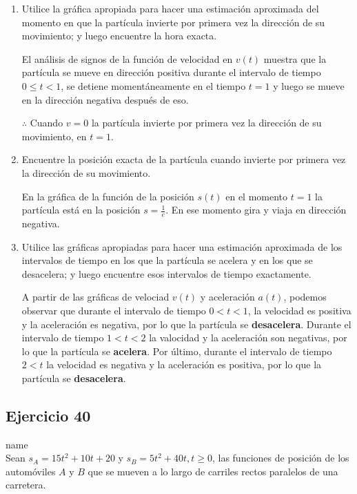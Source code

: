 \documentclass[12pt]{article}
\begin{document}
\begin{enumerate}[label=(\alph*)]
\item Utilice la gráfica apropiada para hacer una estimación aproximada del momento en que la partícula invierte por primera vez la dirección de su movimiento; y luego encuentre la hora exacta.

  El análisis de signos de la función de velocidad en $v(t)$ muestra que la partícula se mueve en dirección positiva durante el intervalo de tiempo $0 \leq t < 1$, se detiene momentáneamente en el tiempo $t = 1$ y luego se mueve en la dirección negativa después de eso.
  
  $\therefore $ Cuando $v=0$ la partícula invierte por primera vez la dirección de su movimiento, en $t=1$.
  
\item Encuentre la posición exacta de la partícula cuando invierte por primera vez la dirección de su movimiento.

  En la gráfica de la función de la posición $s(t)$ en el momento $t = 1$ la partícula está en la posición $s = \frac{1}{e}$. En ese momento gira y viaja en dirección negativa.
  
\item Utilice las gráficas apropiadas para hacer una estimación aproximada de los intervalos de tiempo en los que la partícula se acelera y en los que se desacelera; y luego encuentre esos intervalos de tiempo exactamente.

  A partir de las gráficas de velociad $v(t)$ y aceleración $a(t)$, podemos observar que durante el intervalo de tiempo $0<t<1$, la velocidad es positiva y la aceleración es negativa, por lo que la partícula se \textbf{desacelera}. Durante el intervalo de tiempo $1<t<2$ la valocidad y la aceleración son negativas, por lo que la partícula se \textbf{acelera}. Por último, durante el intervalo de tiempo $2<t$ la velocidad es negativa y la aceleración es positiva, por lo que la partícula se \textbf{desacelera}.
  
\end{enumerate}
    
\subsection{Ejercicio 40} name \\

Sean $s_A = 15t^2 + 10t + 20$ y $s_B = 5t^2 + 40t, t \geq 0$, las funciones de posición de los automóviles $A$ y $B$ que se mueven a lo largo de carriles rectos paralelos de una carretera.
\end{document}

